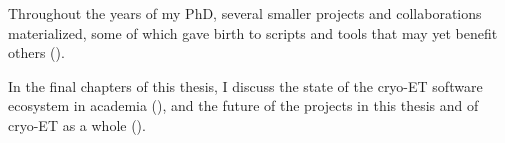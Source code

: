 Throughout the years of my PhD, several smaller projects and collaborations materialized, some of which gave birth to scripts and tools that may yet benefit others ().

In the final chapters of this thesis, I discuss the state of the cryo-ET software ecosystem in academia (), and the future of the projects in this thesis and of cryo-ET as a whole ().
